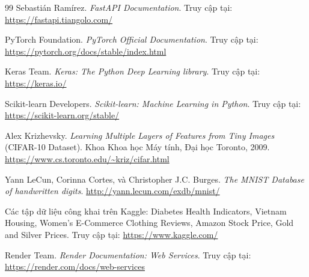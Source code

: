 \documentclass[12pt,a4paper]{article}
\begin{document}
\begin{thebibliography}{99}
Sebastián Ramírez. \textit{FastAPI Documentation}. Truy cập tại: \url{https://fastapi.tiangolo.com/}

PyTorch Foundation. \textit{PyTorch Official Documentation}. Truy cập tại: \url{https://pytorch.org/docs/stable/index.html}

Keras Team. \textit{Keras: The Python Deep Learning library}. Truy cập tại: \url{https://keras.io/}

Scikit-learn Developers. \textit{Scikit-learn: Machine Learning in Python}. Truy cập tại: \url{https://scikit-learn.org/stable/}

Alex Krizhevsky. \textit{Learning Multiple Layers of Features from Tiny Images} (CIFAR-10 Dataset). Khoa Khoa học Máy tính, Đại học Toronto, 2009. \url{https://www.cs.toronto.edu/~kriz/cifar.html}

Yann LeCun, Corinna Cortes, và Christopher J.C. Burges. \textit{The MNIST Database of handwritten digits}. \url{http://yann.lecun.com/exdb/mnist/}

Các tập dữ liệu công khai trên Kaggle: Diabetes Health Indicators, Vietnam Housing, Women's E-Commerce Clothing Reviews, Amazon Stock Price, Gold and Silver Prices. Truy cập tại: \url{https://www.kaggle.com/}

Render Team. \textit{Render Documentation: Web Services}. Truy cập tại: \url{https://render.com/docs/web-services}

\end{thebibliography}
\end{document}
